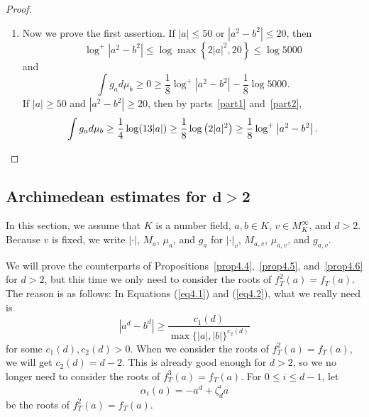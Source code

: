 \documentclass[10pt,a4paper]{amsart}
\numberwithin{equation}{section}
\theoremstyle{plain}
\theoremstyle{definition}
\theoremstyle{remark}
\begin{document}
\begin{proof}
\begin{enumerate}[wide]
Suppose the claim is false; then for each $i$, there exists a $k_{i}$ such that
\[
\left|\alpha_{k_{i}}(a)-\alpha_{i}(b)\right|<5/|a|+5/|b|.
\]
If $k_{i}=k_{j}$ for some $i\neq j$, then
\[
1\leq|\alpha_{i}(b)-\alpha_{j}(b)|\leq|\alpha_{k_{i}}(a)-\alpha_{i}(b)|+|\alpha_{k_{j}}(a)-\alpha_{j}(b)|<10/|a|+10/|b|,
\]
and we have a contradiction. If $k_{i}\neq k_{j}$ for any $i\neq j$, then
\[
4\left|a^{2}-b^{2}\right|=\left|\sum_{i=1}^{4}\alpha_{i}(a)-\sum_{i=1}^{4}\alpha_{i}(b)\right|\leq\sum_{i=1}^{4}|\alpha_{k_{i}}(a)-\alpha_{i}(b)|<20/|a|+20/|b|.
\]
This also gives a contradiction because
\[
\frac{|a|}{|b|}\leq\left(\left|\frac{a^{2}}{b^{2}}-1\right|+1\right)^{1/2}=\left(\frac{\left|a^{2}-b^{2}\right|}{|b|^{2}}+1\right)^{1/2}\leq\left(\frac{20}{28^{2}}+1\right)^{1/2}\leq\frac{6}{5}
\]
and
\[
\left|a^{2}-b^{2}\right|\geq11/|a|\geq5/|a|+5/|b|.
\]
Therefore, the claim is proved and, by Proposition~\ref{prop4.5},
\[
\int g_{a}d\mu_{b}\geq\frac{1}{4}\cdot\frac{1}{4}\log(13|a|)=\frac{1}{16}\log(13|a|).
\]

\item\label{part4}
Now we prove the first assertion. If $|a|\leq50$ or $|a^{2}-b^{2}|\leq20$,
then
\[
\log^{+}\left|a^{2}-b^{2}\right|\leq\log\max\left\{2|a|^{2},20\right\}\leq\log5000
\]
and
\[
\int g_{a}d\mu_{b}\geq0\geq\frac{1}{8}\log^{+}\left|a^{2}-b^{2}\right|-\frac{1}{8}\log5000.
\]
If $|a|\geq50$ and $|a^{2}-b^{2}|\geq20$, then by parts~\eqref{part1} and~\eqref{part2},
\[
\int g_{a}d\mu_{b}\geq\frac{1}{4}\log(13|a|)\geq\frac{1}{8}\log\left(2|a|^{2}\right)\geq\frac{1}{8}\log^{+}\left|a^{2}-b^{2}\right|.\qedhere
\]
\end{enumerate}
\end{proof}

\subsection{Archimedean estimates for \texorpdfstring{$\boldsymbol{d>2}$}{$d>2$}}\label{sec4.3}

In this section, we assume that $K$ is a number field, $a,b\in K$,
$v\in M_{K}^{\infty}$, and $d>2$. Because $v$ is fixed, we write
$|\cdot|$, $M_{a}$, $\mu_{a}$, and $g_{a}$ for $|\cdot|_{v}$,
$M_{a,v}$, $\mu_{a,v}$, and $g_{a,v}$.

We will prove the counterparts of Propositions~\ref{prop4.4},~\ref{prop4.5},
and~\ref{prop4.6} for $d>2$, but this time we only need to consider
the roots of $f_{T}^{2}(a)=f_{T}(a)$. The reason is as follows: In
Equations (\ref{eq4.1}) and (\ref{eq4.2}), what we really need
is
\[
|a^{d}-b^{d}|\geq\frac{c_{1}(d)}{\max\{|a|,|b|\}^{c_{2}(d)}}
\]
for some $c_{1}(d),c_{2}(d)>0$. When we consider the roots of $f_{T}^{2}(a)=f_{T}(a)$,
we will get $c_{2}(d)=d-2$. This is already good enough for $d>2$,
so we no longer need to consider the roots of $f_{T}^{3}(a)=f_{T}(a)$.
For $0\leq i\leq d-1$, let
\[
\alpha_{i}(a)=-a^{d}+\zeta_{d}^{i}a
\]
be the roots of $f_{T}^{2}(a)=f_{T}(a)$.
\end{document}
